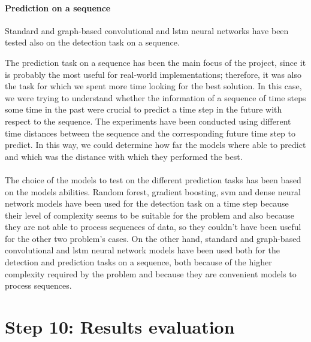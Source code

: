 \paragraph{Prediction on a sequence} Standard and graph-based convolutional and \acs{lstm} neural networks have been tested also on the detection task on a sequence.

The prediction task on a sequence has been the main focus of the project, since it is probably the most useful for real-world implementations; therefore, it was also the task for which we spent more time looking for the best solution. In this case, we were trying to understand whether the information of a sequence of time steps some time in the past were crucial to predict a time step in the future with respect to the sequence. The experiments have been conducted using different time distances between the sequence and the corresponding future time step to predict. In this way, we could determine how far the models where able to predict and which was the distance with which they performed the best.

\paragraph{} The choice of the models to test on the different prediction tasks has been based on the models abilities. Random forest, gradient boosting, \acs{svm} and dense neural network models have been used for the detection task on a time step because their level of complexity seems to be suitable for the problem and also because they are not able to process sequences of data, so they couldn't have been useful for the other two problem's cases. On the other hand, standard and graph-based convolutional and \acs{lstm} neural network models have been used both for the detection and prediction tasks on a sequence, both because of the higher complexity required by the problem and because they are convenient models to process sequences.


\section{Step 10: Results evaluation} \label{sec: step_restults_evaluation}
